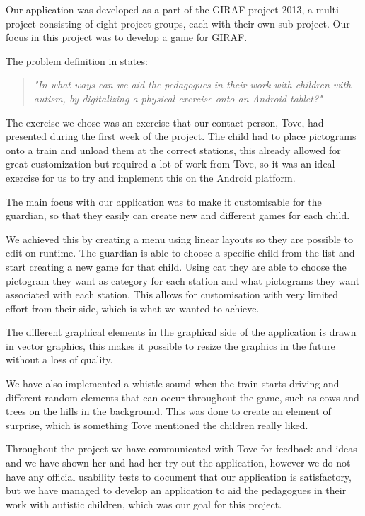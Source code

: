Our application was developed as a part of the GIRAF project 2013, a multi-project consisting of eight project groups, each with their own sub-project. Our focus in this project was to develop a game for GIRAF. 

The problem definition in  states:

\begin{quote}
\textit{"In what ways can we aid the pedagogues in their work with children with autism, by digitalizing a physical exercise onto an Android tablet?"} 
\end{quote}
The exercise we chose was an exercise that our contact person, Tove, had presented during the first week of the project. The child had to place pictograms onto a train and unload them at the correct stations, this already allowed for great customization but required a lot of work from Tove, so it was an ideal exercise for us to try and implement this on the Android platform. 

The main focus with our application was to make it customisable for the guardian, so that they easily can create new and different games for each child. 

We achieved this by creating a menu using linear layouts so they are possible to edit on runtime. The guardian is able to choose a specific child from the list and start creating a new game for that child. Using \ac{cat} they are able to choose the pictogram they want as category for each station and what pictograms they want associated with each station. This allows for customisation with very limited effort from their side, which is what we wanted to achieve. 

The different graphical elements in the graphical side of the application is drawn in vector graphics, this makes it possible to resize the graphics in the future without a loss of quality. 

We have also implemented a whistle sound when the train starts driving and different random elements that can occur throughout the game, such as cows and trees on the hills in the background. This was done to create an element of surprise, which is something Tove mentioned the children really liked. 

Throughout the project we have communicated with Tove for feedback and ideas and we have shown her and had her try out the application, however we do not have any official usability tests to document that our application is satisfactory, but we have managed to develop an application to aid the pedagogues in their work with autistic children, which was our goal for this project. 